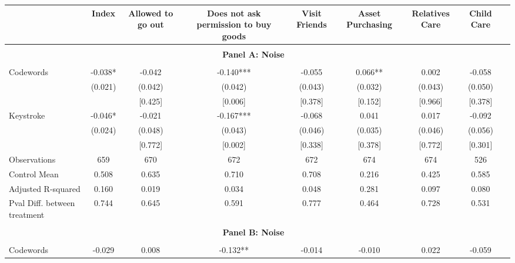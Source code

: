 \begin{tabular}{l*{8}{c}} \hline\hline
                    &\multicolumn{1}{c}{Index}&\multicolumn{1}{c}{Allowed to go out}&\multicolumn{1}{c}{Does not ask permission to buy goods}&\multicolumn{1}{c}{Visit Friends}&\multicolumn{1}{c}{Asset Purchasing}&\multicolumn{1}{c}{Relatives Care}&\multicolumn{1}{c}{Child Care}\\
\hline \\ \multicolumn{8}{c}{\textbf{Panel A: Noise}} \\\\[-1ex]
Codewords           &      -0.038*  &      -0.042   &      -0.140***&      -0.055   &       0.066** &       0.002   &      -0.058   \\
                    &     (0.021)   &     (0.042)   &     (0.042)   &     (0.043)   &     (0.032)   &     (0.043)   &     (0.050)   \\
                    &               &     [0.425]   &     [0.006]   &     [0.378]   &     [0.152]   &     [0.966]   &     [0.378]   \\
Keystroke           &      -0.046*  &      -0.021   &      -0.167***&      -0.068   &       0.041   &       0.017   &      -0.092   \\
                    &     (0.024)   &     (0.048)   &     (0.043)   &     (0.046)   &     (0.035)   &     (0.046)   &     (0.056)   \\
                    &               &     [0.772]   &     [0.002]   &     [0.338]   &     [0.378]   &     [0.772]   &     [0.301]   \\
\hline
Observations        &         659   &         670   &         672   &         672   &         674   &         674   &         526   \\
Control Mean        &       0.508   &       0.635   &       0.710   &       0.708   &       0.216   &       0.425   &       0.585   \\
Adjusted R-squared  &       0.160   &       0.019   &       0.034   &       0.048   &       0.281   &       0.097   &       0.080   \\
Pval Diff. between treatment&       0.744   &       0.645   &       0.591   &       0.777   &       0.464   &       0.728   &       0.531   \\
\hline \\ \multicolumn{8}{c}{\textbf{Panel B: Noise}} \\\\[-1ex]
Codewords           &      -0.029   &       0.008   &      -0.132** &      -0.014   &      -0.010   &       0.022   &      -0.059   \\

\end{tabular}

